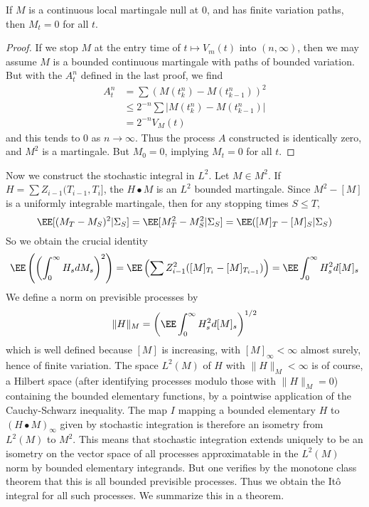 \begin{lemma}
    If $M$ is a continuous local martingale null at 0, and has finite variation paths, then $M_t = 0$ for all $t$.
\end{lemma}
\begin{proof}
    If we stop $M$ at the entry time of $t \mapsto V_m(t)$ into $(n, \infty)$, then we may assume $M$ is a bounded continuous martingale with paths of bounded variation. But with the $A^n_t$ defined in the last proof, we find
    \begin{align*}
        A^n_t &= \sum (M(t^n_k) - M(t^n_{k-1}))^2\\
        &\leq 2^{-n} \sum |M(t^n_k) - M(t^n_{k-1})|\\
        &= 2^{-n} V_M(t)
    \end{align*}
    and this tends to 0 as $n \to \infty$. Thus the process $A$ constructed is identically zero, and $M^2$ is a martingale. But $M_0 = 0$, implying $M_t = 0$ for all $t$.
\end{proof}

Now we construct the stochastic integral in $L^2$. Let $M \in M^2$. If $H = \sum Z_{i-1} (T_{i-1},T_i]$, the $H \bullet M$ is an $L^2$ bounded martingale. Since $M^2 - [M]$ is a uniformly integrable martingale, then for any stopping times $S \leq T$,
%
\[ \EE[(M_T - M_S)^2|\Sigma_S] = \EE[M_T^2 - M_S^2 | \Sigma_S] = \EE([M]_T - [M]_S | \Sigma_S) \]
%
So we obtain the crucial identity
%
\[ \EE \left( \left( \int_0^\infty H_s dM_s \right)^2 \right) = \EE \left( \sum Z_{i-1}^2 ([M]_{T_i} - [M]_{T_{i-1}}) \right) = \EE \int_0^\infty H_s^2 d[M]_s \]
%
We define a norm on previsible processes by
%
\[ \| H \|_M = \left( \EE \int_0^\infty H_s^2 d[M]_s \right)^{1/2} \]
%
which is well defined because $[M]$ is increasing, with $[M]_\infty < \infty$ almost surely, hence of finite variation. The space $L^2(M)$ of $H$ with $\| H \|_M < \infty$ is of course, a Hilbert space (after identifying processes modulo those with $\| H \|_M = 0$) containing the bounded elementary functions, by a pointwise application of the Cauchy-Schwarz inequality. The map $I$ mapping a bounded elementary $H$ to $(H \bullet M)_\infty$ given by stochastic integration is therefore an isometry from $L^2(M)$ to $M^2$. This means that stochastic integration extends uniquely to be an isometry on the vector space of all processes approximatable in the $L^2(M)$ norm by bounded elementary integrands. But one verifies by the monotone class theorem that this is all bounded previsible processes. Thus we obtain the It\^{o} integral for all such processes. We summarize this in a theorem.

